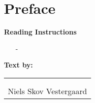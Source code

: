 \chapter*{Preface}
\vspace{-12 pt}
\lipsum[3]

\textbf{Reading Instructions}
\vspace{-10 pt}
\begin{itemize}
\item[-] \lipsum[6]
\end{itemize}

%
\textbf{Text by:}\\
\vspace{-12 pt}
\begin{table}[H]
	\centering
		\begin{tabular}{c c c}
			&&\\
	    \multicolumn{3}{c}{\underline{\phantom{- Niels Skov Vestergaard -}}}\\
	    \multicolumn{3}{c}{Niels Skov Vestergaard}\\				
		\end{tabular}
\end{table}
\pagebreak